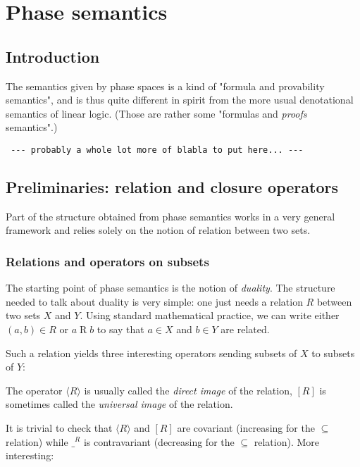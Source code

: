 \section{Phase semantics}\label{phase-semantics}

\subsection{Introduction}\label{introduction}

The semantics given by phase spaces is a kind of "formula and
provability semantics", and is thus quite different in spirit from the
more usual denotational semantics of linear logic. (Those are rather
some "formulas and \emph{proofs} semantics".)

\texttt{~-\/-\/-~probably~a~whole~lot~more~of~blabla~to~put~here...~-\/-\/-}

\subsection{Preliminaries: relation and closure
operators}\label{preliminaries-relation-and-closure-operators}

Part of the structure obtained from phase semantics works in a very
general framework and relies solely on the notion of relation between
two sets.

\subsubsection{Relations and operators on
subsets}\label{relations-and-operators-on-subsets}

The starting point of phase semantics is the notion of \emph{duality}.
The structure needed to talk about duality is very simple: one just
needs a relation \(R\) between two sets \(X\) and \(Y\). Using standard
mathematical practice, we can write either \((a,b) \in R\) or
\(a\mathrel{R} b\) to say that \(a\in X\) and \(b\in Y\) are related.

Such a relation yields three interesting operators sending subsets of
\(X\) to subsets of \(Y\):

The operator \(\langle R\rangle\) is usually called the \emph{direct
image} of the relation, \([R]\) is sometimes called the \emph{universal
image} of the relation.

It is trivial to check that \(\langle R\rangle\) and \([R]\) are
covariant (increasing for the \(\subseteq\) relation) while \(\_^R\) is
contravariant (decreasing for the \(\subseteq\) relation). More
interesting:

